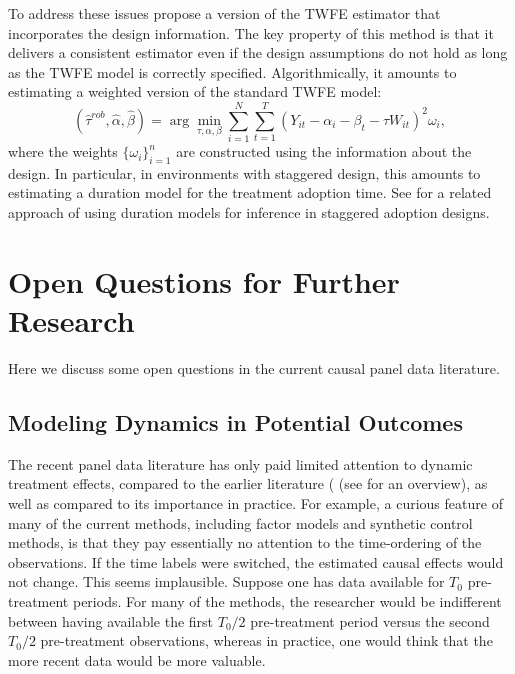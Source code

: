 \documentclass[letterpaper,12pt,leqno]{article}
\begin{document}
To address these issues \citep{lihua2021} propose a version of the TWFE estimator that incorporates the design information. The key property of this method is that it delivers a consistent estimator even if the design assumptions do not hold as long as the TWFE model is correctly specified. Algorithmically, it amounts to estimating a weighted version of the standard TWFE model:
    \begin{equation}\label{estimator:wtwfe}
(\hat\tau^{rob},\hat\alpha,\hat\beta)=\arg\min_{\tau,\alpha,\beta}
\sum_{i=1}^N\sum_{t=1}^T \left( Y_{it}-\alpha_i-\beta_t-\tau W_{it}\right)^2\omega_i,
\end{equation}
where the weights $\{\omega_i\}_{i=1}^n$ are constructed using the information about the design.  In particular, in environments with staggered design, this amounts to estimating a duration model for the treatment adoption time. See \cite{shaikh2021randomization} for a related approach of using duration models for inference in staggered adoption designs. 

\section{Open Questions for Further Research}\label{section:future}

Here we discuss some open questions in the current causal panel data literature.

\subsection{Modeling Dynamics in Potential Outcomes}


The recent panel data literature has only paid limited attention to dynamic treatment effects, compared to the earlier literature (\citealp*{heckman2007dynamic, anderson1981estimation} (see \citep{abbring2007econometric} for an overview), as well as compared to its importance in practice.
For example, a curious feature of many of the current methods, including factor models and synthetic control methods, is that they pay essentially no attention to the time-ordering of the observations. If the time labels were switched, the estimated causal effects would not change. This seems implausible. Suppose one has data available for $T_0$ pre-treatment periods. For many of the methods, the researcher would be indifferent between having available the first $T_0/2$ pre-treatment period versus the second $T_0/2$ pre-treatment observations, whereas in practice, one would think that the more recent data would be more valuable.
\end{document}

